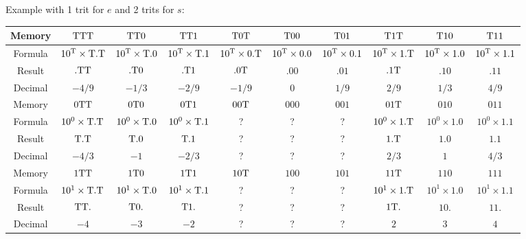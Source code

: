 \documentclass{article}
\begin{document}
\noindent
Example with 1 trit for $e$ and 2 trits for $s$: \\
\hspace{-2cm}
\begin{tabular}{*{10}{|c}|}
  \hline
  Memory
  & $\mathrm{T}\mathrm{T}\mathrm{T}$ & $\mathrm{T}\mathrm{T}0$ & $\mathrm{T}\mathrm{T}1$
  & $\mathrm{T}0\mathrm{T}$ & $\mathrm{T}00$ & $\mathrm{T}01$
  & $\mathrm{T}1\mathrm{T}$ & $\mathrm{T}10$ & $\mathrm{T}11$ \\ \hline
  Formula
  & $10^{\mathrm{T}} \times \mathrm{T}.\mathrm{T}$ & $10^{\mathrm{T}} \times \mathrm{T}.0$ & $10^{\mathrm{T}} \times \mathrm{T}.1$
  & $10^{\mathrm{T}} \times 0.\mathrm{T}$ & $10^{\mathrm{T}} \times 0.0$ & $10^{\mathrm{T}} \times 0.1$
  & $10^{\mathrm{T}} \times 1.\mathrm{T}$ & $10^{\mathrm{T}} \times 1.0$ & $10^{\mathrm{T}} \times 1.1$ \\ \hline
  Result
  & $.\mathrm{T}\mathrm{T}$ & $.\mathrm{T}0$ & $.\mathrm{T}1$
  & $.0\mathrm{T}$ & $.00$ & $.01$
  & $.1\mathrm{T}$ & $.10$ & $.11$ \\ \hline
  Decimal
  & $-4/9$ & $-1/3$ & $-2/9$
  & $-1/9$ & $0$ & $1/9$
  & $2/9$ & $1/3$ & $4/9$ \\ \hline
  \hline
  Memory
  & $0\mathrm{T}\mathrm{T}$ & $0\mathrm{T}0$ & $0\mathrm{T}1$
  & $00\mathrm{T}$ & $000$ & $001$
  & $01\mathrm{T}$ & $010$ & $011$ \\ \hline
  Formula
  & $10^0 \times \mathrm{T}.\mathrm{T}$ & $10^0 \times \mathrm{T}.0$ & $10^0 \times \mathrm{T}.1$
  & ? & ? & ?
  & $10^0 \times 1.\mathrm{T}$ & $10^0 \times 1.0$ & $10^0 \times 1.1$ \\ \hline
  Result
  & $\mathrm{T}.\mathrm{T}$ & $\mathrm{T}.0$ & $\mathrm{T}.1$
  & ? & ? & ?
  & $1.\mathrm{T}$ & $1.0$ & $1.1$ \\ \hline
  Decimal
  & $-4/3$ & $-1$ & $-2/3$
  & ? & ? & ?
  & $2/3$ & $1$ & $4/3$ \\ \hline
  \hline
  Memory
  & $1\mathrm{T}\mathrm{T}$ & $1\mathrm{T}0$ & $1\mathrm{T}1$
  & $10\mathrm{T}$ & $100$ & $101$
  & $11\mathrm{T}$ & $110$ & $111$ \\ \hline
  Formula
  & $10^1 \times \mathrm{T}.\mathrm{T}$ & $10^1 \times \mathrm{T}.0$ & $10^1 \times \mathrm{T}.1$
  & ? & ? & ?
  & $10^1 \times 1.\mathrm{T}$ & $10^1 \times 1.0$ & $10^1 \times 1.1$ \\ \hline
  Result
  & $\mathrm{T}\mathrm{T}.$ & $\mathrm{T}0.$ & $\mathrm{T}1.$
  & ? & ? & ?
  & $1\mathrm{T}.$ & $10.$ & $11.$ \\ \hline
  Decimal
  & $-4$ & $-3$ & $-2$
  & ? & ? & ?
  & $2$ & $3$ & $4$ \\ \hline
\end{tabular}
\end{document}
